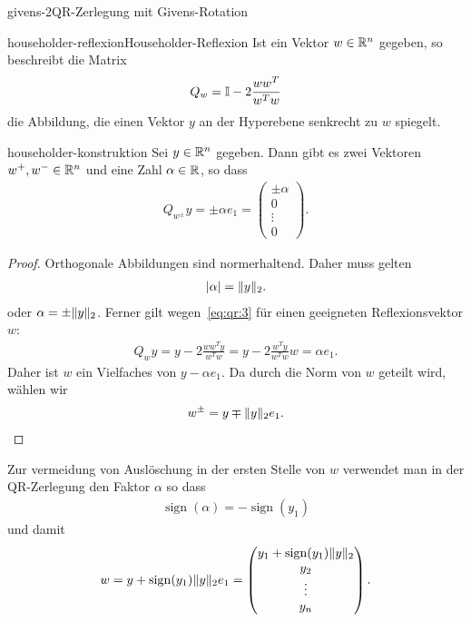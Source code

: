 \begin{Algorithmus*}{givens-2}{QR-Zerlegung mit Givens-Rotation}
  
\end{Algorithmus*}

\begin{Definition*}{householder-reflexion}{Householder-Reflexion}
  Ist ein Vektor $w\in \mathbb R^n$ gegeben, so beschreibt die Matrix
  \begin{gather}
    Q_w = \mathbb I - 2\frac{ww^T}{w^Tw}
  \end{gather}
  die Abbildung, die einen Vektor $y$ an der Hyperebene senkrecht zu
  $w$ spiegelt.
\end{Definition*}

\begin{Lemma}{householder-konstruktion}
  Sei $y\in\mathbb R^n$ gegeben. Dann gibt es zwei Vektoren $w^+,w^-\in\mathbb R^n$
  und eine Zahl $\alpha\in \mathbb R$, so dass
  \begin{gather}
    \label{eq:qr:3}
    Q_{w^\pm} y = \pm \alpha e_1 =
    \begin{pmatrix}
      \pm \alpha\\0\\\vdots\\0
    \end{pmatrix}.
  \end{gather}
\end{Lemma}

\begin{proof}
  Orthogonale Abbildungen sind normerhaltend. Daher muss gelten
  \begin{gather}
    \lvert\alpha\rvert = \lVert y\rVert_2.
  \end{gather}
  oder $\alpha = \pm\lVert y\rVert_2$.  Ferner gilt
  wegen~\eqref{eq:qr:3} für einen geeigneten Reflexionsvektor $w$:
  \begin{gather}
    Q_{w} y = y-2 \frac{ww^Ty}{w^Tw} = y-2\frac{w^Ty}{w^Tw}w = \alpha e_1.
  \end{gather}
  Daher ist $w$ ein Vielfaches von $y - \alpha e_1$. Da durch die Norm
  von $w$ geteilt wird, wählen wir
  \begin{gather}
    w^{\pm} = y\mp \lVert y\rVert_2 e_1.
  \end{gather}
\end{proof}

\begin{remark}
  Zur vermeidung von Auslöschung in der ersten Stelle von $w$
  verwendet man in der QR-Zerlegung den Faktor $\alpha$ so dass
  \begin{gather}
    \operatorname{sign} (\alpha) = -\operatorname{sign} (y_1)
  \end{gather}
  und damit
  \begin{gather}
    w = y + \operatorname{sign} (y_1) \lVert y\rVert_2 e_1
    =
    \begin{pmatrix}
      y_1 + \operatorname{sign} (y_1) \lVert y\rVert_2\\
      y_2\\\vdots\\y_n
    \end{pmatrix}.
  \end{gather}
\end{remark}

